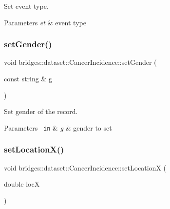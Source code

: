 Set event type. 


\begin{DoxyParams}{Parameters}
{\em et} & event type \\
\hline
\end{DoxyParams}
\mbox{\label{classbridges_1_1dataset_1_1_cancer_incidence_aaf7aa19ce1946af9443e1584e5998e7b}} 
\subsubsection{\texorpdfstring{setGender()}{setGender()}}
{\footnotesize\ttfamily void bridges\+::dataset\+::\+Cancer\+Incidence\+::set\+Gender (\begin{DoxyParamCaption}\item[{const string \&}]{g }\end{DoxyParamCaption})\hspace{0.3cm}{\ttfamily [inline]}}



Set gender of the record. 


\begin{DoxyParams}[1]{Parameters}
\mbox{\texttt{ in}}  & {\em g} & gender to set \\
\hline
\end{DoxyParams}
\mbox{\label{classbridges_1_1dataset_1_1_cancer_incidence_af373c05a20c7a230f62be3ed53889787}} 
\subsubsection{\texorpdfstring{setLocationX()}{setLocationX()}}
{\footnotesize\ttfamily void bridges\+::dataset\+::\+Cancer\+Incidence\+::set\+LocationX (\begin{DoxyParamCaption}\item[{double}]{locX }\end{DoxyParamCaption})\hspace{0.3cm}{\ttfamily [inline]}}



